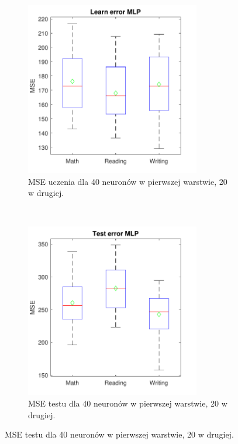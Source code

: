 \documentclass[12pt]{article}
\begin{document}
\begin{figure}[H]
\centering
\begin{subfigure}[t]{0.48\textwidth} 
\centering
\includegraphics[height=3in]{radbas_tansig_purelin_20_learnBoxplot.pdf}
\caption{MSE uczenia dla  40 neuronów w pierwszej warstwie, 20 w drugiej.}
\end{subfigure}
~~
\begin{subfigure}[t]{0.48\textwidth} 
\centering
\includegraphics[height=3in]{radbas_tansig_purelin_20_testBoxplot.pdf}
\caption{MSE testu dla  40 neuronów w pierwszej warstwie, 20 w drugiej.}
\end{subfigure}


\end{figure}
\end{document}
